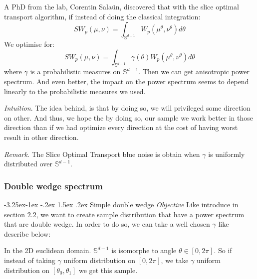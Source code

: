\documentclass{classeENS}
\makeatletter
\newcounter{subsubsubsection}[subsubsection]
\newcommand\subsubsubsection{\@startsection{subsubsubsection}{4}{\z@}%
                                     {-3.25ex\@plus -1ex \@minus -.2ex}%
                                     {1.5ex \@plus .2ex}%
                                     {\normalfont\normalsize\bfseries}}
\makeatother
\begin{document}
\> A PhD from the lab, Corentin Salaün, discovered that with the slice optimal transport
algorithm, if instead of doing the classical integration:
\[SW_p(\mu, \nu) = \int_{\mathbb{S}^{d-1}} W_p(\mu^\theta,\nu^\theta) d\theta\]
We optimise for:
\[SW_p(\mu, \nu) = \int_{\mathbb{S}^{d-1}} \gamma(\theta) W_p(\mu^\theta,\nu^\theta) d\theta\]
where $\gamma$ is a probabilistic measures on $\mathbb{S}^{d-1}$. Then we can get anisotropic
power spectrum. And even better, the impact on the power spectrum seems to depend linearly to
the probabilistic measures we used.

\> \textit{Intuition}. The idea behind, is that by doing so, we will privileged some
    direction on other. And thus, we hope the by doing so, our sample we work better in
    those direction than if we had optimize every direction at the cost of having worst result
    in other direction.
    
\> \textit{Remark}. The Slice Optimal Transport blue noise is obtain when 
    $\gamma$ is uniformly distributed over $\mathbb{S}^{d-1}$.

\subsubsection{Double wedge spectrum}

\subsubsubsection{Simple double wedge}
\textit{Objective} Like introduce in section $2.2$, we want to create sample distribution
    that have a power spectrum that are double wedge. In order to do so, we can take
    a well chosen $\gamma$ like describe below:

In the 2D euclidean domain. $\mathbb{S}^{d-1}$ is isomorphe to angle $\theta \in [0,2\pi]$.
So if instead of taking $\gamma$ uniform distribution on $[0,2\pi]$, we take $\gamma$
uniform distribution on $[\theta_0,\theta_1]$ we get this sample.
\end{document}
